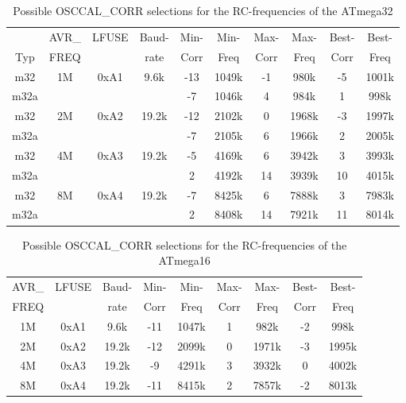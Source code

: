 \begin{table}[H]
  \begin{center}
    \begin{tabular}{| c | c | c | c || c | c || c | c || c | c |}
    \hline
        &     AVR\_ & LFUSE & Baud- & Min- & Min- & Max- & Max- & Best- & Best-  \\
 Typ    &     FREQ  &       & rate & Corr & Freq & Corr & Freq  & Corr  & Freq  \\
    \hline
    \hline
m32  &       1M    & 0xA1  &  9.6k &  -13  & 1049k & -1  & 980k  & -5  & 1001k \\
m32a &             &       &       &  -7  & 1046k &  4  & 984k  & 1  & 998k \\
    \hline
m32  &       2M    & 0xA2  & 19.2k &  -12  & 2102k &  0  & 1968k & -3  & 1997k \\
m32a &             &       &       &  -7  & 2105k &  6  & 1966k & 2  & 2005k \\
    \hline
m32  &       4M    & 0xA3  & 19.2k &  -5  & 4169k & 6  & 3942k & 3  & 3993k \\
m32a &             &       &       &   2  & 4192k & 14  & 3939k & 10  & 4015k \\
    \hline
m32  &       8M    & 0xA4  & 19.2k &  -7  & 8425k &  6  & 7888k & 3  & 7983k \\
m32a &             &       &       &   2  & 8408k & 14  & 7921k & 11  & 8014k \\
    \hline
    \end{tabular}
  \end{center}
  \caption{Possible OSCCAL\_CORR selections for the RC-frequencies of the ATmega32}
  \label{tab:mega32freq}
\end{table}

\begin{table}[H]
  \begin{center}
    \begin{tabular}{| c | c | c || c | c || c | c || c | c |}
    \hline
             AVR\_ & LFUSE & Baud- & Min- & Min- & Max- & Max- & Best- & Best-  \\
             FREQ  &       & rate & Corr & Freq & Corr & Freq  & Corr  & Freq  \\
    \hline
    \hline
                1M & 0xA1  &  9.6k &  -11  & 1047k &  1  & 982k  & -2  & 998k \\
    \hline
                2M & 0xA2  & 19.2k &  -12  & 2099k &  0  & 1971k & -3 & 1995k \\
    \hline
                4M & 0xA3  & 19.2k &  -9  & 4291k &  3  & 3932k & 0  & 4002k \\
    \hline
                8M & 0xA4  & 19.2k &  -11 & 8415k & 2  & 7857k & -2  & 8013k \\
    \hline
    \end{tabular}
  \end{center}
  \caption{Possible OSCCAL\_CORR selections for the RC-frequencies of the ATmega16}
  \label{tab:mega16freq}
\end{table}

